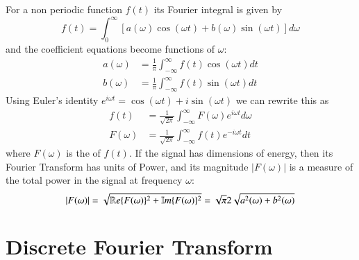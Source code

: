 \documentclass[12pt]{report}
\begin{document}
\begin{proc}{}{}
        For a non periodic function $f(t)$ its Fourier integral is given by \begin{equation}
                f(t) = \int_0^{\infty}\left[a(\omega)\cos(\omega t) + b(\omega)\sin(\omega t)\right]d\omega
        \end{equation}
        and the coefficient equations become functions of $\omega$:\begin{align}
                a(\omega) &= \frac{1}{\pi}\int_{-\infty}^{\infty}f(t)\cos(\omega t)dt \\
                b(\omega) &= \frac{1}{\pi}\int_{-\infty}^{\infty}f(t)\sin(\omega t)dt
        \end{align}
        Using Euler's identity $e^{i\omega t} = \cos(\omega t) + i\sin(\omega t)$ we can rewrite this as \begin{align}
                f(t) &= \frac{1}{\sqrt{2\pi}}\int_{-\infty}^{\infty}F(\omega)e^{i\omega t}d\omega \\
                F(\omega) &= \frac{1}{\sqrt{2\pi}}\int_{-\infty}^{\infty}f(t)e^{-i\omega t}dt
        \end{align}
        where $F(\omega)$ is the  of $f(t)$. If the signal has dimensions of energy, then its Fourier Transform has units of Power, and its magnitude $|F(\omega)|$ is a measure of the total power in the signal at frequency $\omega$: \begin{equation}
                |F(\omega)| = \sqrt{\mathbb R e\{F(\omega)\}^2+\mathbb{I}m\{F(\omega)\}^2} = \sqrt{\pi}{2}\sqrt{a^2(\omega) + b^2(\omega)}
        \end{equation}
\end{proc}


\section{Discrete Fourier Transform}
\end{document}
